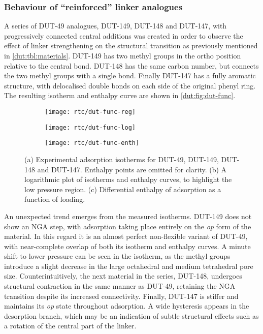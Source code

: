 \subsubsection{Behaviour of ``reinforced'' linker analogues}

A series of DUT-49 analogues, DUT-149, DUT-148 and DUT-147, 
with progressively connected central additions was created in
order to observe the effect of linker strengthening on the 
structural transition as previously mentioned in
\autoref{dut:tbl:materials}. DUT-149 has two methyl groups in the 
ortho position relative to the central bond. DUT-148 has 
the same carbon number, but connects the two methyl groups
with a single bond. Finally DUT-147 has a fully aromatic
structure, with delocalised double bonds on each side of the 
original phenyl ring. The resulting isotherm and enthalpy 
curve are shown in \autoref{dut:fig:dut-func}.

\begin{figure}[htb]
    \centering
    \begin{subfigure}{0.33\linewidth}
        \texttt{[image: rtc/dut-func-reg]}%
        \caption{}\label{dut:fig:dut-func-reg}
    \end{subfigure}%
    \begin{subfigure}{0.33\linewidth}
        \texttt{[image: rtc/dut-func-log]}%
        \caption{}\label{dut:fig:dut-func-log}
    \end{subfigure}%
    \begin{subfigure}{0.33\linewidth}
        \texttt{[image: rtc/dut-func-enth]}%
        \caption{}\label{dut:fig:dut-func-enth}
    \end{subfigure}%
    \caption{(a) Experimental adsorption isotherms for DUT-49, DUT-149,
    DUT-148 and DUT-147. Enthalpy points are omitted for clarity. 
    (b) A logarithmic plot of isotherms and enthalpy curves,
    to highlight the low pressure region. 
    (c) Differential enthalpy of adsorption as a function of loading.}%
    \label{dut:fig:dut-func}
\end{figure}

An unexpected trend emerges from the measured isotherms. DUT-149
does not show an NGA step, with adsorption taking place entirely
on the \textit{op} form of the material. In this regard it is
an almost perfect non-flexible variant of DUT-49, with near-complete
overlap of both its isotherm and enthalpy curves. A minute 
shift to lower pressure can be seen in the isotherm, as the 
methyl groups introduce a slight decrease in the large octahedral
and medium tetrahedral pore size. Counterintuitively, the next material
in the series, DUT-148, undergoes structural contraction in the
same manner as DUT-49, retaining the NGA transition despite its 
increased connectivity. Finally, DUT-147 is stiffer and maintains
its \textit{op} state throughout adsorption. A wide hysteresis
appears in the desorption branch, which may be an indication of 
subtle structural effects such as a rotation of the central part
of the linker.

